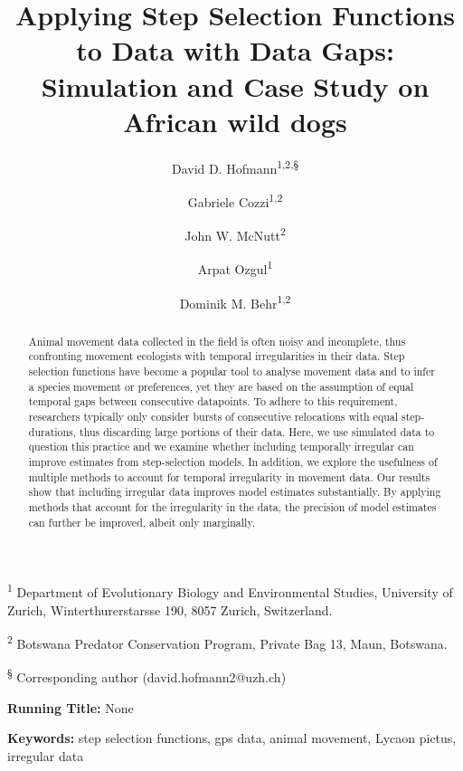 \documentclass[abstract=on,10pt,a4paper,bibliography=totocnumbered]{article}
\title{Applying Step Selection Functions to Data with Data Gaps: Simulation and
Case Study on African wild dogs}
\author{
  David D. Hofmann\textsuperscript{1,2,\S} \and
  Gabriele Cozzi\textsuperscript{1,2} \and
  John W. McNutt\textsuperscript{2} \and
  Arpat Ozgul\textsuperscript{1} \and
  Dominik M. Behr\textsuperscript{1,2}
}
\begin{document}



\maketitle

\begin{flushleft}

\vspace{0.5cm}

\textsuperscript{1} Department of Evolutionary Biology and Environmental
Studies, University of Zurich, Winterthurerstarsse 190, 8057 Zurich,
Switzerland.

\textsuperscript{2} Botswana Predator Conservation Program, Private Bag 13,
Maun, Botswana.

\textsuperscript{\S} Corresponding author (david.hofmann2@uzh.ch)

\vspace{4cm}

\textbf{Running Title:} None

\vspace{0.5cm}

\textbf{Keywords:} step selection functions, gps data, animal movement, Lycaon
pictus, irregular data

\end{flushleft}

\newpage
\begin{abstract}
Animal movement data collected in the field is often noisy and incomplete, thus
confronting movement ecologists with temporal irregularities in their data. Step
selection functions have become a popular tool to analyse movement data and to
infer a species movement or preferences, yet they are based on the assumption of
equal temporal gaps between consecutive datapoints. To adhere to this
requirement, researchers typically only consider bursts of consecutive
relocations with equal step-durations, thus discarding large portions of their
data. Here, we use simulated data to question this practice and we examine
whether including temporally irregular can improve estimates from step-selection
models. In addition, we explore the usefulness of multiple methods to account
for temporal irregularity in movement data. Our results show that including
irregular data improves model estimates substantially. By applying methods that
account for the irregularity in the data, the precision of model estimates can
further be improved, albeit only marginally.
\end{abstract}
\end{document}
